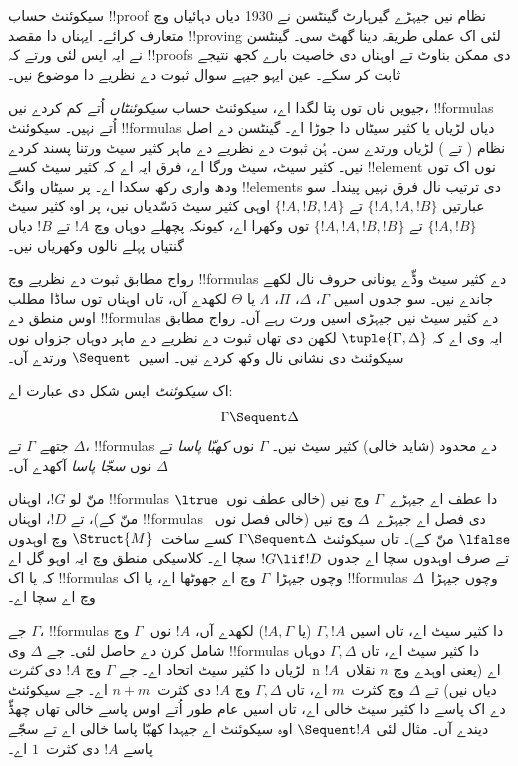 \documentclass[../../../include/open-logic-section]{subfiles}
\begin{document}


سیکوئنٹ حساب !!{proof} نظام نیں جیہڑے گیرہارٹ گینٹسن نے 1930 دیاں دہائیاں وچ متعارف کرائے۔ ایہناں دا مقصد !!{proving} لئی اک عملی طریقہ دینا گھٹ سی۔ گینٹسن نے ایہ ایس لئی ورتے کہ !!{proof}s دی ممکن بناوٹ تے اوہناں دی خاصیت بارے کجھ نتیجے ثابت کر سکے۔ عین ایہو جیہے سوال ثبوت دے نظریے دا موضوع نیں۔

جیویں ناں توں پتا لگدا اے، سیکوئنٹ حساب \emph{سیکوئنٹاں} اُتے کم کردے نیں، !!{formula}s اُتے نہیں۔ سیکوئنٹ !!{formula}s دیاں لڑیاں یا کثیر سیٹاں دا جوڑا اے۔ گینٹسن دے اصل نظام ( تے ) لڑیاں ورتدے سن۔ ہُن ثبوت دے نظریے دے ماہر کثیر سیٹ ورتنا پسند کردے نیں۔ کثیر سیٹ، سیٹ ورگا اے، فرق ایہ اے کہ کثیر سیٹ کسے !!{element} نوں اک توں ودھ واری رکھ سکدا اے۔ پر سیٹاں وانگ !!{element}s دی ترتیب نال فرق نہیں پیندا۔ سو عبارتیں $\{!A, !A, !B\}$ تے $\{!A, !B, !A\}$ اوہی کثیر سیٹ دَسّدیاں نیں، پر اوہ کثیر سیٹ $\{!A,
!B\}$ تے $\{!A, !A, !B, !B\}$ توں وکھرا اے، کیونکہ پچھلے دوہاں وچ $!A$ تے $!B$ دیاں گنتیاں پہلے نالوں وکھریاں نیں۔

رواج مطابق ثبوت دے نظریے وچ !!{formula}s دے کثیر سیٹ وڈّے یونانی حروف نال لکھے جاندے نیں۔ سو جدوں اسیں $\Gamma$، $\Delta$، $\Pi$، $\Lambda$ یا $\Theta$ لکھدے آں، تاں اوہناں توں ساڈا مطلب اوس منطق دے !!{formula}s دے کثیر سیٹ نیں جیہڑی اسیں ورت رہے آں۔ رواج مطابق ایہ وی اے کہ $\tuple{\Gamma, \Delta}$ لکھن دی تھاں ثبوت دے نظریے دے ماہر دوہاں جزواں نوں سیکوئنٹ دی نشانی نال وکھ کردے نیں۔ اسیں~$\Sequent$ ورتدے آں۔

\begin{defn}[سیکوئنٹ]
اک \emph{سیکوئنٹ} ایس شکل دی عبارت اے:
\[
\Gamma \Sequent \Delta
\]
جتھے $\Gamma$ تے $\Delta$، !!{formula}s دے محدود (شاید خالی) کثیر سیٹ نیں۔ $\Gamma$ نوں \emph{کھبّا پاسا} تے $\Delta$ نوں \emph{سجّا پاسا} آکھدے آں۔
\end{defn}

منّ لو $!G$، اوہناں !!{formula}s دا عطف اے جیہڑے~$\Gamma$ وچ نیں (خالی عطف نوں~$\ltrue$ منّ کے)، تے $!D$، اوہناں !!{formula}s دی فصل اے جیہڑے~$\Delta$ وچ نیں (خالی فصل نوں~$\lfalse$ منّ کے)۔ تاں سیکوئنٹ $\Gamma \Sequent \Delta$ کسے ساخت~$\Struct{M}$ وچ اوہدوں تے صرف اوہدوں سچا اے جدوں $!G \lif !D$ سچا اے۔ کلاسیکی منطق وچ ایہ اوہو گل اے کہ یا اک !!{formula}s وچوں جیہڑا~$\Gamma$ وچ اے جھوٹھا اے، یا اک !!{formula}s وچوں جیہڑا~$\Delta$ وچ اے سچا اے۔

جے $\Gamma$، !!{formula}s دا کثیر سیٹ اے، تاں اسیں $\Gamma, !A$ (یا $!A, \Gamma$) لکھدے آں، $!A$ نوں~$\Gamma$ وچ شامل کرن دے حاصل لئی۔ جے $ \Delta$ وی !!{formula}s دا کثیر سیٹ اے، تاں $\Gamma, \Delta$ دوہاں لڑیاں دا کثیر سیٹ اتحاد اے۔ جے $\Gamma$ وچ $!A$ دی \emph{کثرت}~n اے (یعنی اوہدے وچ $n$ نقلاں~$!A$ دیاں نیں) تے $ \Delta$ وچ کثرت~$m$ اے، تاں $\Gamma, \Delta$ وچ $!A$ دی کثرت~$n+m$ اے۔ جے سیکوئنٹ دے اک پاسے دا کثیر سیٹ خالی اے، تاں اسیں عام طور اُتے اوس پاسے خالی تھاں چھڈّ دیندے آں۔ مثال لئی $\Sequent !A$ اوہ سیکوئنٹ اے جیہدا کھبّا پاسا خالی اے تے سجّے پاسے $!A$ دی کثرت~$1$ اے۔
\end{document}
